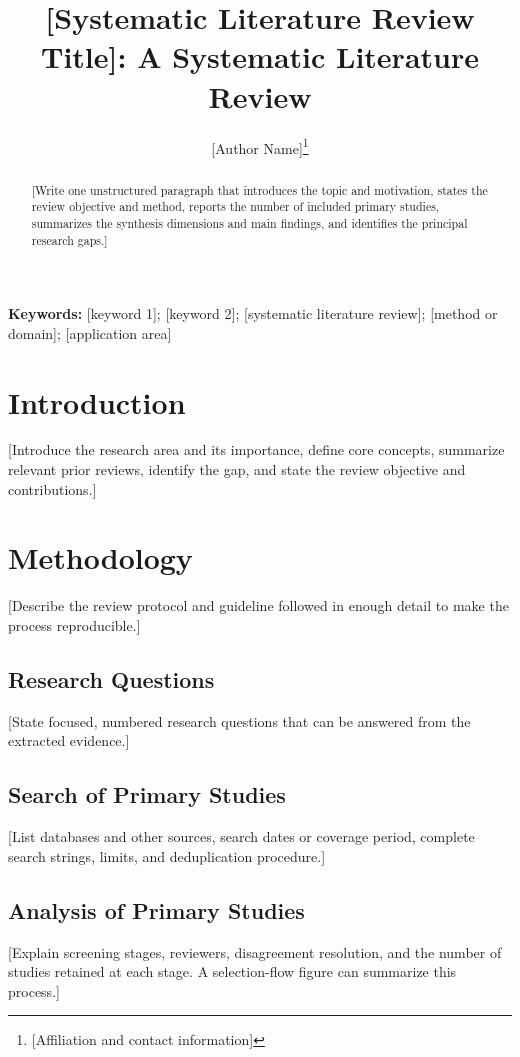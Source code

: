 \documentclass[11pt]{article}
\title{[Systematic Literature Review Title]: A Systematic Literature Review}
\author{[Author Name]\thanks{[Affiliation and contact information]}}
\date{}
\begin{document}
\maketitle

\begin{abstract}
[Write one unstructured paragraph that introduces the topic and motivation, states the review objective and method, reports the number of included primary studies, summarizes the synthesis dimensions and main findings, and identifies the principal research gaps.]
\end{abstract}

\textbf{Keywords:} [keyword 1]; [keyword 2]; [systematic literature review]; [method or domain]; [application area]

\section{Introduction}
[Introduce the research area and its importance, define core concepts, summarize relevant prior reviews, identify the gap, and state the review objective and contributions.]

\section{Methodology}
[Describe the review protocol and guideline followed in enough detail to make the process reproducible.]

\subsection{Research Questions}
[State focused, numbered research questions that can be answered from the extracted evidence.]

\subsection{Search of Primary Studies}
[List databases and other sources, search dates or coverage period, complete search strings, limits, and deduplication procedure.]

\subsection{Analysis of Primary Studies}
[Explain screening stages, reviewers, disagreement resolution, and the number of studies retained at each stage. A selection-flow figure can summarize this process.]
\end{document}
